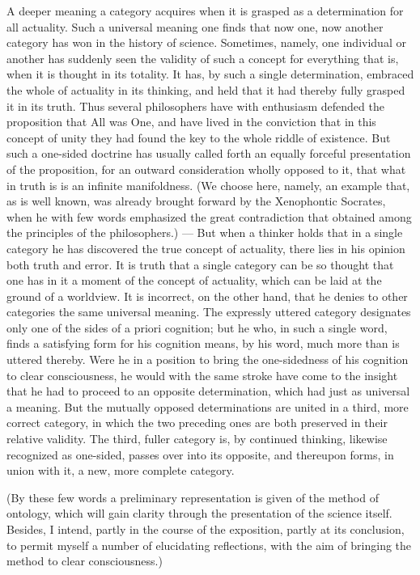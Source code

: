 \documentclass[12pt]{article}
\newcommand{\opage}[1]{\marginnote{\footnotesize\textit{[#1]}}}
\begin{document}
A deeper meaning a category acquires when it is grasped as a determination for all
actuality. Such a universal meaning one finds that now one, now another category
has won in the history of science. Sometimes, namely, one individual or another has
suddenly seen the validity of such a concept for everything that is, when it is
thought in its totality. It has, by such a single determination, embraced the whole
of actuality in its thinking, and held that it had thereby fully grasped it in its
truth. Thus several philosophers have with enthusiasm defended the proposition that
All was One, and have lived in the conviction that in this concept of unity they
had found the key to the whole riddle of existence. But such a \opage{200}one-sided
doctrine has usually called forth an equally forceful presentation of the
proposition, for an outward consideration wholly opposed to it, that what in truth
is is an infinite manifoldness. (We choose here, namely, an example that, as is
well known, was already brought forward by the Xenophontic Socrates, when he with
few words emphasized the great contradiction that obtained among the principles of
the philosophers.) --- But when a thinker holds that in a single category he has
discovered the true concept of actuality, there lies in his opinion both truth and
error. It is truth that a single category can be so thought that one has in it a
moment of the concept of actuality, which can be laid at the ground of a worldview.
It is incorrect, on the other hand, that he denies to other categories the same
universal meaning. The expressly uttered category designates only one of the sides
of a priori cognition; but he who, in such a single word, finds a satisfying form
for his cognition means, by his word, much more than is uttered thereby. Were he in
a position to bring the one-sidedness of his cognition to clear consciousness, he
would with the same stroke have come to the insight that he had to proceed to an
opposite determination, which had just as universal a meaning. But the mutually
opposed determinations are united in a third, more correct category, in which the
two preceding ones are both preserved in their relative validity. The third, fuller
category is, by continued thinking, likewise recognized as one-sided, passes over
into its opposite, and thereupon forms, in union with it, a new, more complete
category.

(By these few words a preliminary representation is given of the method of
ontology, which will gain clarity through the presentation of the science itself.
Besides, I intend, partly in the course of the exposition, partly at its
conclusion, to permit myself a number of elucidating reflections, with the aim of
bringing the method to clear consciousness.)
\end{document}
